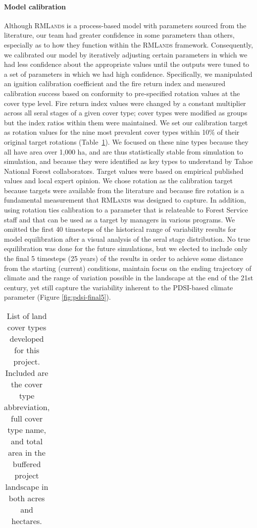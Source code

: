 \documentclass[12pt]{article}
\begin{document}
\begin{spacing}{1}
\paragraph{Model calibration}
Although \textsc{RMLands} is a process-based model with parameters sourced from the literature, our team had greater confidence in some parameters than others, especially as to how they function within the \textsc{RMLands} framework. Consequently, we calibrated our model by iteratively adjusting certain parameters in which we had less confidence about the appropriate values until the outputs were tuned to a set of parameters in which we had high confidence. Specifically, we manipulated an ignition calibration coefficient and the fire return index and measured calibration success based on conformity to pre-specified rotation values at the cover type level. Fire return index values were changed by a constant multiplier across all seral stages of a given cover type; cover types were modified as groups but the index ratios within them were maintained. We set our calibration target as rotation values for the nine most prevalent cover types within 10\% of their original target rotations (Table~\ref{tab:covertable}). We focused on these nine types because they all have area over 1,000 ha, and are thus statistically stable from simulation to simulation, and because they were identified as key types to understand by Tahoe National Forest collaborators. Target values were based on empirical published values and local expert opinion. We chose rotation as the calibration target because targets were available from the literature and because fire rotation is a fundamental measurement that \textsc{RMLands} was designed to capture. In addition, using rotation ties calibration to a parameter that is relateable to Forest Service staff and that can be used as a target by managers in various programs. We omitted the first 40 timesteps of the historical range of variability results for model equilibration after a visual analysis of the seral stage distribution. No true equilibration was done for the future simulations, but we elected to include only the final 5 timesteps (25 years) of the results in order to achieve some distance from the starting (current) conditions, maintain focus on the ending trajectory of climate and the range of variation possible in the landscape at the end of the 21st century, yet still capture the variability inherent to the PDSI-based climate parameter (Figure \ref{fig:pdsi-final5}).


\begin{table}[!htbp]
\small
\centering
\caption{List of land cover types developed for this project. Included are the cover type abbreviation, full cover type name, and total area in the buffered project landscape in both acres and hectares.}
\label{tab:covertable}
\begin{tabular}{@{}llll@{}}


\end{tabular}
\end{table}
\end{spacing}
\end{document}
